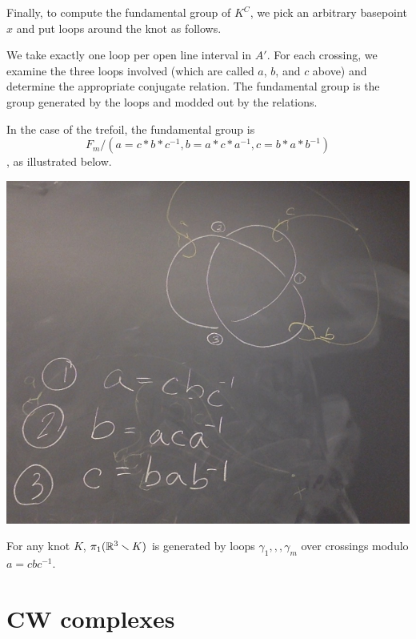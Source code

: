 \documentclass[11pt,leqno,oneside]{amsart}
\numberwithin{thm}{section}
\newcommand{\minus}{\smallsetminus}
\newcommand{\fund}{\pi_1}
\begin{document}
\begin{example}
  Finally, to compute the fundamental group of $K^C$, we pick an
  arbitrary basepoint $x$ and put loops around the knot as follows.

  We take exactly one loop per open line interval in $A'$.  For each
  crossing, we examine the three loops involved (which are called $a$,
  $b$, and $c$ above) and determine the appropriate conjugate
  relation.  The fundamental group is the group generated by the loops
  and modded out by the relations.

  In the case of the trefoil, the fundamental group
  is $${F_m}/{(a=c*b*c^{-1}, b=a*c*a^{-1}, c=b*a*b^{-1})}$$, as
  illustrated below.

  \includegraphics[scale=0.2]{images/trefoil-fully-described.jpg}
\end{example}
\begin{thm}[Wirtinger]
  For any knot $K$, $\fund(\R^3\minus K)$ is generated by loops
  $\gamma_1,,,\gamma_m$ over crossings modulo $a = cbc^{-1}$.
\end{thm}


\section{CW complexes}
\end{document}
